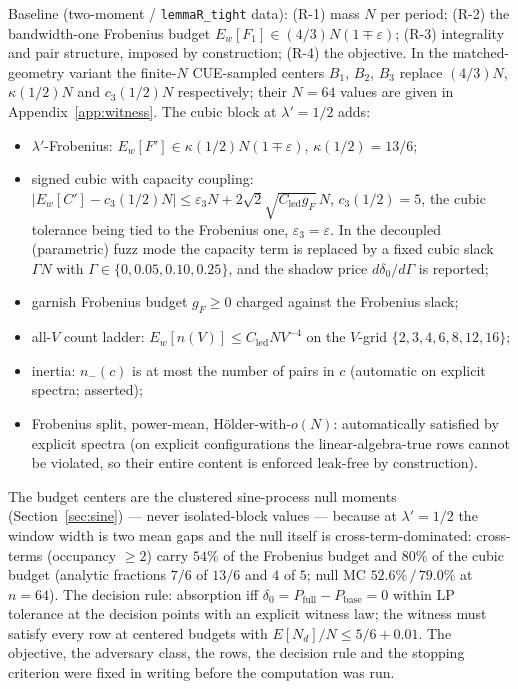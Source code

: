 \documentclass[11pt]{article}
\theoremstyle{plain}
\theoremstyle{definition}
\theoremstyle{remark}
\newcommand{\Cled}{C_{\mathrm{led}}}
\newcommand{\Nd}{N_{d}}
\begin{document}
Baseline (two-moment / \texttt{lemmaR\_tight} data): (R-1) mass $N$ per period;
(R-2) the bandwidth-one
Frobenius budget $E_w[F_1] \in (4/3) N (1 \mp \varepsilon)$; (R-3) integrality
and pair structure, imposed by construction; (R-4) the objective. In the
matched-geometry variant the finite-$N$ CUE-sampled centers $B_1$, $B_2$, $B_3$
replace $(4/3)N$, $\kappa(1/2)N$ and $c_3(1/2)N$ respectively; their $N = 64$
values are given in Appendix~\ref{app:witness}. The cubic block at
$\lambda' = 1/2$ adds:
\begin{itemize}
\item[(R-5)] $\lambda'$-Frobenius:
  $E_w[F'] \in \kappa(1/2) N (1 \mp \varepsilon)$, $\kappa(1/2) = 13/6$;
\item[(R-6)] signed cubic with capacity coupling:
  $\bigl| E_w[C'] - c_3(1/2) N \bigr|
   \le \varepsilon_3 N + 2\sqrt{2}\sqrt{\Cled g_F}\, N$, $c_3(1/2) = 5$, the
  cubic tolerance being tied to the Frobenius one, $\varepsilon_3 = \varepsilon$.
  In the decoupled (parametric) fuzz mode the capacity term is replaced by a
  fixed cubic slack $\Gamma N$ with $\Gamma \in \{0, 0.05, 0.10, 0.25\}$, and the
  shadow price $d\delta_0/d\Gamma$ is reported;
\item[(R-5$'$)] garnish Frobenius budget $g_F \ge 0$ charged against the
  Frobenius slack;
\item[(R-7)] all-$V$ count ladder:
  $E_w[n(V)] \le \Cled N V^{-4}$ on the $V$-grid $\{2, 3, 4, 6, 8, 12, 16\}$;
\item[(R-8)] inertia: $n_-(c)$ is at most the number of pairs in $c$ (automatic
  on explicit spectra; asserted);
\item[(R-9)] Frobenius split, power-mean, H\"older-with-$o(N)$: automatically
  satisfied by explicit spectra (on
  explicit configurations the linear-algebra-true rows cannot be violated, so
  their entire content is enforced leak-free by construction).
\end{itemize}

The budget centers are the clustered sine-process null moments
(Section~\ref{sec:sine}) --- never isolated-block values --- because at
$\lambda' = 1/2$ the window width is two mean gaps and the null itself is
cross-term-dominated: cross-terms (occupancy $\ge 2$) carry $54\%$ of the
Frobenius budget and $80\%$ of the cubic budget (analytic fractions $7/6$ of
$13/6$ and $4$ of $5$; null MC $52.6\%\,/\,79.0\%$ at $n = 64$). The decision
rule: absorption iff
$\delta_0 = P_{\mathrm{full}} - P_{\mathrm{base}} = 0$ within LP tolerance at the
decision points with an explicit witness law; the witness must satisfy every row
at centered budgets with $E[\Nd]/N \le 5/6 + 0.01$. The objective, the adversary
class, the rows, the decision rule and the stopping criterion were fixed in
writing before the computation was run.
\end{document}
